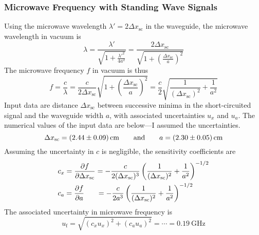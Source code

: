 \documentclass[11pt, a4paper]{article}
\newcommand{\eqtext}[1]{\qquad \text{#1} \qquad}
\begin{document}
\subsubsection{Microwave Frequency with Standing Wave Signals}
Using the microwave wavelength $ \lambda ' = 2\Delta x_{\text{sc}} $  in the waveguide, the microwave wavelength in vacuum is
\begin{equation*}
	\lambda = \frac{\lambda'}{\sqrt{1 + \frac{\lambda'^{2}}{4a^{2}}}} = \frac{2\Delta x_{\text{sc}}}{\sqrt{1 + \left(\frac{\Delta x_{\text{sc}}}{a}\right)^{2}}}
\end{equation*}
The microwave frequency $ f $ in vacuum is thus
\begin{equation*}
	f = \frac{c}{\lambda} = \frac{c}{2\Delta x_{\text{sc}}}\sqrt{1 + \left(\frac{\Delta x_{\text{sc}}}{a}\right)^{2}} = \frac{c}{2}\sqrt{\frac{1}{(\Delta x_{\text{sc}})^{2}} + \frac{1}{a^{2}}}
\end{equation*}
Input data are distance $ \Delta x_{\text{sc}} $ between successive minima in the short-circuited signal and the waveguide width $ a $, with associated uncertainties $ u_{x} $ and $ u_{a} $. The numerical values of the input data are below---I assumed the uncertainties.
\begin{equation*}
	\Delta x_{\text{sc}} = \SI{2.44 \pm 0.09}{\centi \meter} \eqtext{and} a = \SI{2.30 \pm 0.05}{\centi \meter}
\end{equation*}
Assuming the uncertainty in $ c $ is negligible, the sensitivity coefficients are
\begin{align*}
	&c_{x} = \pdv{f}{\Delta x_{\text{sc}}} = -\frac{c}{2(\Delta x_{\text{sc}})^{3}}\left(\frac{1}{(\Delta x_{\text{sc}})^{2}} + \frac{1}{a^{2}}\right)^{-1/2}\\
	&c_{a} = \pdv{f}{a} \hspace{6mm}= -\frac{c}{2a^{3}}\left(\frac{1}{(\Delta x_{\text{sc}})^{2}} + \frac{1}{a^{2}}\right)^{-1/2}
\end{align*}
The associated uncertainty in microwave frequency is
\begin{equation*}
	u_{\text{f}} = \sqrt{(c_{x}u_{x})^2 + (c_{a}u_{a})^2} = \cdots = \SI{0.19}{\giga \hertz}
\end{equation*}
\end{document}
